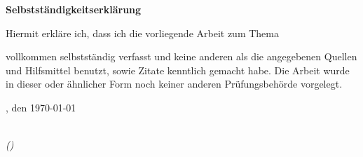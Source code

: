 \noindent \begin{center}
\textsf{\textbf{\large Selbstständigkeitserklärung}}
\par\end{center}{\large \par}

\noindent 

\noindent

\medskip{}

\noindent 

\vspace{1.7cm}
\thispagestyle{empty}

\begin{large}

\noindent
Hiermit erkläre ich, dass ich die vorliegende Arbeit zum
Thema\newline


\textsf{\textbf{}}\newline


\smallskip{}


\noindent vollkommen selbstständig verfasst und keine anderen als
die angegebenen Quellen und Hilfsmittel benutzt, sowie Zitate kenntlich
gemacht habe. Die Arbeit wurde in dieser oder ähnlicher Form noch
keiner anderen Prüfungsbehörde vorgelegt.


\vspace{2cm}

\noindent
{}, den \today

\vspace{3cm}

\hspace*{7cm}%
\dotfill\\
\hspace*{9.7cm}%
\textit{(\@author)}

\end{large}
